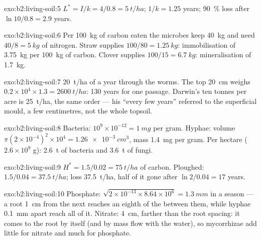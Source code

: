 \begin{solution}{exo:b2:living-soil:5}
$L^{*} = I/k = 4/0.8 = \qty{5}{t/ha}$;  $1/k = 1.25$
years; \qty{90}{\%} loss after $\ln 10/0.8 = 2.9$ years.
\end{solution}

\begin{solution}{exo:b2:living-soil:6}
Per \qty{100}{kg} of carbon eaten the microbes keep \qty{40}{kg} and
need $40/8 = \qty{5}{kg}$ of nitrogen. Straw supplies $100/80 =
\qty{1.25}{kg}$: immobilisation of \qty{3.75}{kg} per \qty{100}{kg}
of carbon. Clover supplies $100/15 = \qty{6.7}{kg}$: mineralisation
of \qty{1.7}{kg}.
\end{solution}

\begin{solution}{exo:b2:living-soil:7}
\qty{20}{t/ha} of  a year through the worms. The top
\qty{20}{cm} weighs $0.2\times 10^{4}\times 1.3 = \qty{2600}{t/ha}$:
130 years for one passage. Darwin's ten tonnes per acre is
\qty{25}{t/ha}, the same order --- his ``every few years'' referred
to the superficial mould, a few centimetres, not the whole topsoil.
\end{solution}

\begin{solution}{exo:b2:living-soil:8}
Bacteria: $10^{9}\times 10^{-12} = \qty{1}{mg}$ per gram. Hyphae:
volume $\pi(2\times 10^{-4})^{2}\times 10^{4} = \qty{1.26e-3}{cm^3}$,
mass \qty{1.4}{mg} per gram. Per hectare ($2.6\times 10^{9}$ g):
\qty{2.6}{t} of bacteria and \qty{3.6}{t} of fungi.
\end{solution}

\begin{solution}{exo:b2:living-soil:9}
$H^{*} = 1.5/0.02 = \qty{75}{t/ha}$ of carbon. Ploughed: $1.5/0.04
= \qty{37.5}{t/ha}$; loss \qty{37.5}{t/ha}, half of it gone after
$\ln 2/0.04 = 17$ years.
\end{solution}

\begin{solution}{exo:b2:living-soil:10}
Phosphate: $\sqrt{2\times 10^{-13}\times 8.64\times 10^{6}} =
\qty{1.3}{mm}$ in a season --- a root \qty{1}{cm} from the next
reaches an eighth of the  between them, while hyphae
\qty{0.1}{mm} apart reach all of it. Nitrate: \qty{4}{cm}, farther
than the root spacing: it comes to the root by itself (and by mass
flow with the water), so mycorrhizae add little for nitrate and
much for phosphate.
\end{solution}

